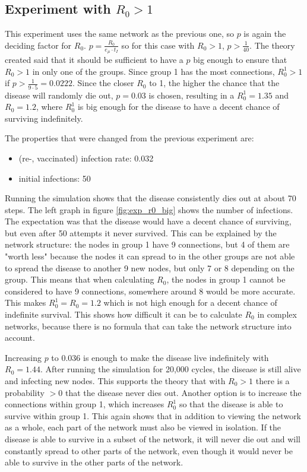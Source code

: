 \subsection{Experiment with $R_0 > 1$}
This experiment uses the same network as the previous one, so $p$ is again the deciding factor for $R_0$. $p = \frac{R_0}{e_\mu \cdot t_I}$ so for this case with $R_0 > 1$, $p > \frac{1}{40}$. The theory created said that it should be sufficient to have a $p$ big enough to ensure that $R_0 > 1$ in only one of the groups. Since group 1 has the most connections, $R_0^1 > 1$ if $p > \frac{1}{9\cdot5} = 0.0222$. Since the closer $R_0$ to 1, the higher the chance that the disease will randomly die out, $p=0.03$ is chosen, resulting in a $R_0^1 = 1.35$ and $R_0 = 1.2$, where $R_0^1$ is big enough for the disease to have a decent chance of surviving indefinitely.

The properties that were changed from the previous experiment are:
\begin{itemize}
    \item (re-, vaccinated) infection rate: 0.032
    \item initial infections: 50
\end{itemize}

Running the simulation shows that the disease consistently dies out at about 70 steps. The left graph in figure \ref{fig:exp_r0_big} shows the number of infections. The expectation was that the disease would have a decent chance of surviving, but even after 50 attempts it never survived. This can be explained by the network structure: the nodes in group 1 have 9 connections, but 4 of them are "worth less" because the nodes it can spread to in the other groups are not able to spread the disease to another 9 new nodes, but only 7 or 8 depending on the group. This means that when calculating $R_0$, the nodes in group 1 cannot be considered to have 9 connections, somewhere around 8 would be more accurate. This makes $R_0^1 = R_0 = 1.2$ which is not high enough for a decent chance of indefinite survival. This shows how difficult it can be to calculate $R_0$ in complex networks, because there is no formula that can take the network structure into account.

Increasing $p$ to 0.036 is enough to make the disease live indefinitely with $R_0 = 1.44$. After running the simulation for 20,000 cycles, the disease is still alive and infecting new nodes. This supports the theory that with $R_0 > 1$ there is a probability $> 0$ that the disease never dies out. Another option is to increase the connections within group 1, which increases $R_0^1$ so that the disease is able to survive within group 1. This again shows that in addition to viewing the network as a whole, each part of the network must also be viewed in isolation. If the disease is able to survive in a subset of the network, it will never die out and will constantly spread to other parts of the network, even though it would never be able to survive in the other parts of the network.


